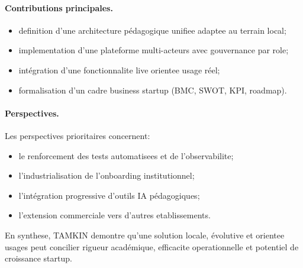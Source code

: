 \documentclass[12pt,a4paper,oneside]{report}
\begin{document}
\paragraph{Contributions principales.}
\begin{itemize}
  \item definition d'une architecture pédagogique unifiee adaptee au terrain local;
  \item implementation d'une plateforme multi-acteurs avec gouvernance par role;
  \item intégration d'une fonctionnalite live orientee usage réel;
  \item formalisation d'un cadre business startup (BMC, SWOT, KPI, roadmap).
\end{itemize}

\paragraph{Perspectives.}
Les perspectives prioritaires concernent:
\begin{itemize}
  \item le renforcement des tests automatisees et de l'observabilite;
  \item l'industrialisation de l'onboarding institutionnel;
  \item l'intégration progressive d'outils IA pédagogiques;
  \item l'extension commerciale vers d'autres etablissements.
\end{itemize}

En synthese, TAMKIN demontre qu'une solution locale, évolutive et orientee usages peut concilier rigueur académique, efficacite operationnelle et potentiel de croissance startup.


\clearpage
\printbibliography[title={Bibliographie}, heading=bibintoc]
\end{document}
